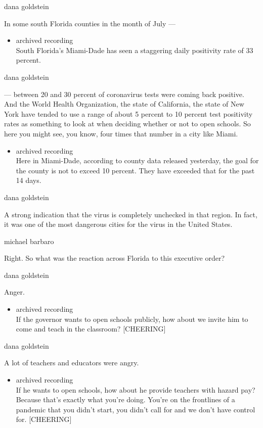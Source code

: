 dana goldstein

In some south Florida counties in the month of July ---

\begin{itemize}
\tightlist
\item
  archived recording\\
  South Florida's Miami-Dade has seen a staggering daily positivity rate
  of 33 percent.
\end{itemize}

dana goldstein

--- between 20 and 30 percent of coronavirus tests were coming back
positive. And the World Health Organization, the state of California,
the state of New York have tended to use a range of about 5 percent to
10 percent test positivity rates as something to look at when deciding
whether or not to open schools. So here you might see, you know, four
times that number in a city like Miami.

\begin{itemize}
\tightlist
\item
  archived recording\\
  Here in Miami-Dade, according to county data released yesterday, the
  goal for the county is not to exceed 10 percent. They have exceeded
  that for the past 14 days.
\end{itemize}

dana goldstein

A strong indication that the virus is completely unchecked in that
region. In fact, it was one of the most dangerous cities for the virus
in the United States.

michael barbaro

Right. So what was the reaction across Florida to this executive order?

dana goldstein

Anger.

\begin{itemize}
\tightlist
\item
  archived recording\\
  If the governor wants to open schools publicly, how about we invite
  him to come and teach in the classroom? {[}CHEERING{]}
\end{itemize}

dana goldstein

A lot of teachers and educators were angry.

\begin{itemize}
\tightlist
\item
  archived recording\\
  If he wants to open schools, how about he provide teachers with hazard
  pay? Because that's exactly what you're doing. You're on the
  frontlines of a pandemic that you didn't start, you didn't call for
  and we don't have control for. {[}CHEERING{]}
\end{itemize}

